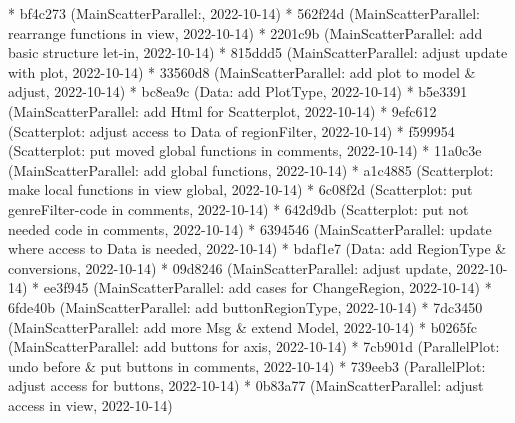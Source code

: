\documentclass[usegeometry=true]{scrartcl}
\begin{document}
* bf4c273 (MainScatterParallel:, 2022-10-14)\newline
* 562f24d (MainScatterParallel: rearrange functions in view, 2022-10-14)\newline
* 2201c9b (MainScatterParallel: add basic structure let-in, 2022-10-14)\newline
* 815ddd5 (MainScatterParallel: adjust update with plot, 2022-10-14)\newline
* 33560d8 (MainScatterParallel: add plot to model \& adjust, 2022-10-14)\newline
* bc8ea9c (Data: add PlotType, 2022-10-14)\newline
* b5e3391 (MainScatterParallel: add Html for Scatterplot, 2022-10-14)\newline
* 9efc612 (Scatterplot: adjust access to Data of regionFilter, 2022-10-14) \newline
* f599954 (Scatterplot: put moved global functions in comments, 2022-10-14) \newline
* 11a0c3e (MainScatterParallel: add global functions, 2022-10-14)\newline
* a1c4885 (Scatterplot: make local functions in view global, 2022-10-14)\newline
* 6c08f2d (Scatterplot: put genreFilter-code in comments, 2022-10-14)\newline
* 642d9db (Scatterplot: put not needed code in comments, 2022-10-14)\newline
* 6394546 (MainScatterParallel: update where access to Data is needed, 2022-10-14)\newline
* bdaf1e7 (Data: add RegionType \& conversions, 2022-10-14)\newline
* 09d8246 (MainScatterParallel: adjust update, 2022-10-14) \newline
* ee3f945 (MainScatterParallel: add cases for ChangeRegion, 2022-10-14)\newline
* 6fde40b (MainScatterParallel: add buttonRegionType, 2022-10-14)\newline
* 7dc3450 (MainScatterParallel: add more Msg \& extend Model, 2022-10-14) \newline
* b0265fc (MainScatterParallel: add buttons for axis, 2022-10-14)\newline
* 7cb901d (ParallelPlot: undo before \& put buttons in comments, 2022-10-14)\newline
* 739eeb3 (ParallelPlot: adjust access for buttons, 2022-10-14)\newline
* 0b83a77 (MainScatterParallel: adjust access in view, 2022-10-14)\newline
\end{document}
